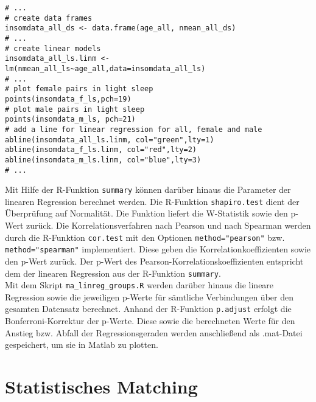 \begin{lstlisting}[caption={Erstellung eines Streudiagramms und Einzeichnung der Regressionslinien in dem Skript ma\_linreg\_nmean\_age.R}, label={lst:nmean_age}]
# ...
# create data frames
insomdata_all_ds <- data.frame(age_all, nmean_all_ds)
# ...
# create linear models
insomdata_all_ls.linm <- lm(nmean_all_ls~age_all,data=insomdata_all_ls)
# ...
# plot female pairs in light sleep
points(insomdata_f_ls,pch=19)
# plot male pairs in light sleep
points(insomdata_m_ls, pch=21)
# add a line for linear regression for all, female and male 
abline(insomdata_all_ls.linm, col="green",lty=1)
abline(insomdata_f_ls.linm, col="red",lty=2)
abline(insomdata_m_ls.linm, col="blue",lty=3)
# ...
\end{lstlisting}

Mit Hilfe der R-Funktion \texttt{summary} können darüber hinaus die Parameter der linearen Regression berechnet werden. Die R-Funktion \texttt{shapiro.test} dient der Überprüfung auf Normalität. Die Funktion liefert die W-Statistik sowie den p-Wert zurück. Die Korrelationsverfahren nach Pearson und nach Spearman werden durch die R-Funktion \texttt{cor.test} mit den Optionen \texttt{method="pearson"} bzw. \texttt{method="spearman"} implementiert. Diese geben die Korrelationkoeffizienten sowie den p-Wert zurück. Der p-Wert des Pearson-Korrelationskoeffizienten entspricht dem der linearen Regression aus der R-Funktion \texttt{summary}.\\

Mit dem Skript \texttt{ma\_linreg\_groups.R} werden darüber hinaus die lineare Regression sowie die jeweiligen p-Werte für sämtliche Verbindungen über den gesamten Datensatz berechnet. Anhand der R-Funktion \texttt{p.adjust} erfolgt die Bonferroni-Korrektur der p-Werte. Diese sowie die berechneten Werte für den Anstieg bzw. Abfall der Regressionsgeraden werden anschließend als .mat-Datei gespeichert, um sie in Matlab zu plotten.

\section{Statistisches Matching}\label{matching}

